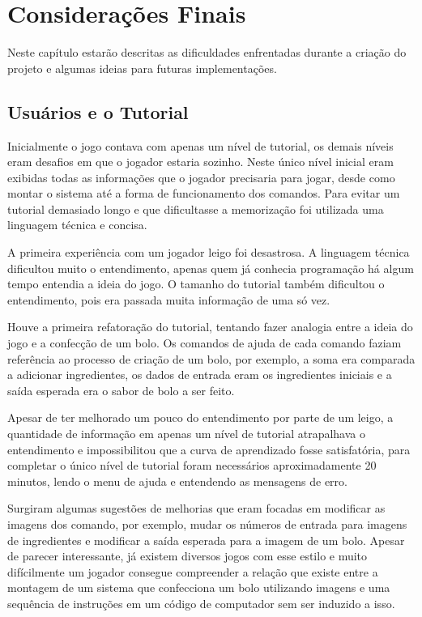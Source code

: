 \chapter{Considerações Finais}
\label{cap:Considerações Finais}

Neste capítulo estarão descritas as dificuldades enfrentadas durante a criação 
do projeto e algumas ideias para futuras implementações.

\section{Usuários e o Tutorial}

Inicialmente o jogo contava com apenas um nível de tutorial, os demais níveis 
eram desafios em que o jogador estaria sozinho. Neste único nível inicial eram
exibidas todas as informações que o jogador precisaria para jogar, desde como 
montar o sistema até a forma de funcionamento dos comandos. Para evitar um 
tutorial demasiado longo e que dificultasse a memorização foi utilizada uma 
linguagem técnica e concisa.

A primeira experiência com um jogador leigo foi desastrosa. A linguagem técnica 
dificultou muito o entendimento, apenas quem já conhecia programação há algum 
tempo entendia a ideia do jogo. O tamanho do tutorial também dificultou o 
entendimento, pois era passada muita informação de uma só vez.

Houve a primeira refatoração do tutorial, tentando fazer analogia entre a ideia
do jogo e a confecção de um bolo. Os comandos de ajuda de cada comando faziam 
referência ao processo de criação de um bolo, por exemplo, a soma era comparada 
a adicionar ingredientes, os dados de entrada eram os ingredientes iniciais e 
a saída esperada era o sabor de bolo a ser feito.

Apesar de ter melhorado um pouco do entendimento por parte de um leigo, a
quantidade de informação em apenas um nível de tutorial atrapalhava o
entendimento e impossibilitou que a curva de aprendizado fosse satisfatória,
para completar o único nível de tutorial foram necessários aproximadamente 20
minutos, lendo o menu de ajuda e entendendo as mensagens de erro.

Surgiram algumas sugestões de melhorias que eram focadas em modificar as imagens
dos comando, por exemplo, mudar os números de entrada para imagens de 
ingredientes e modificar a saída esperada para a imagem de um bolo. Apesar de 
parecer interessante, já existem diversos jogos com esse estilo e muito 
difícilmente um jogador consegue compreender a relação que existe entre a 
montagem de um sistema que confecciona um bolo utilizando imagens e uma 
sequência de instruções em um código de computador sem ser induzido a isso.

